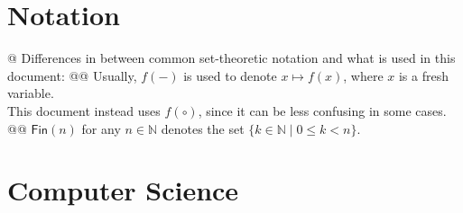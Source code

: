 \documentclass[]{article}
\newcommand{\mbb}[1]{\ensuremath{\mathbb{#1}}}     %
\newcommand{\msf}[1]{\ensuremath{\mathsf{#1}}}     %
\begin{document}

\section{Notation}

\begin{easylist}[itemize]
@ {%
  Differences in between common set-theoretic notation and what is used in
  this document:
}
@@ {%
  Usually, $f({-})$ is used to denote $x \mapsto f(x)$, where $x$ is a fresh
  variable. \\ This document instead uses $f(\circ)$, since it can be less
  confusing in some cases.
}
@@ {%
  $\msf{Fin}(n)$ for any $n \in \mbb{N}$ denotes the set
  $\{k \in \mbb{N} \mid 0 \le k < n\}$.
}
\end{easylist}


\section{Computer Science}
\end{document}
